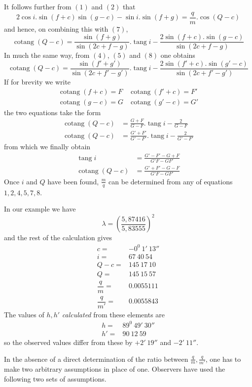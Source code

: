 It follows further from $(1)$ and $(2)$ that
\[
2\cos i.\sin(f+c)\sin(g-c)-\sin i.\sin(f+g)=\frac{q}{m}.\cos(Q-c)
\]
and hence, on combining this with $(7)$,
\[
\operatorname{cotang}(Q-c)=\frac{\sin(f+g)}{\sin(2c+f-g)}.\operatorname{tang}i-\frac{2\sin(f+c).\sin(g-c)}{\sin(2c+f-g)}
\]
In much the same way, from $(4)$, $(5)$ and $(8)$ one obtains
\[
\operatorname{cotang}(Q-c)=\frac{\sin(f'+g')}{\sin(2c+f'-g')}.\operatorname{tang}i-\frac{2\sin(f'+c).\sin(g'-c)}{\sin(2c+f'-g')}
\]
If for brevity we write
\[
\begin{array}{ll}
\operatorname{cotang}(f+c)=F&\operatorname{cotang}(f'+c)=F'\\
\operatorname{cotang}(g-c)=G&\operatorname{cotang}(g'-c)=G'
\end{array}
\]
the two equations take the form
\[
\begin{aligned}
\operatorname{cotang}(Q-c)&=\frac{G+F}{G-F}.\operatorname{tang}i-\frac{2}{G-F}\\
\operatorname{cotang}(Q-c)&=\frac{G'+F'}{G'-F'}.\operatorname{tang}i-\frac{2}{G'-F'}
\end{aligned}
\]
from which we finally obtain
\[
\begin{aligned}
\operatorname{tang}i&=\frac{G'-F'-G+F}{G'F-GF'}\\
\operatorname{cotang}(Q-c)&=\frac{G'+F'-G-F}{G'F-GF'}
\end{aligned}
\]
Once $i$ and $Q$ have been found, $\frac{m}{q}$ can be determined from any of equations $1,2,4,5,7,8$.

In our example we have
\[
\lambda=\left(\frac{5{,}87416}{5{,}83555}\right)^2
\]
and the rest of the calculation gives
\[
\begin{array}{rl}
c=&-0^0\ 1'\ 13''\\
i=&67\ 40\ 54\\
Q-c=&145\ 17\ 10\\
Q=&145\ 15\ 57\\
\dfrac{q}{m}=&0.0055111\\[4pt]
\dfrac{q}{m'}=&0.0055843
\end{array}
\]
The values of $h,h'$ \textit{calculated} from these elements are
\[
\begin{array}{rl}
h=&89^0\ 49'\ 30''\\
h'=&90\ 12\ 59
\end{array}
\]
so the observed values differ from these by $+2'\ 19''$ and $-2'\ 11''$.

In the absence of a direct determination of the ratio between $\frac{q}{m},\frac{q}{m'}$, one has to make two arbitrary assumptions in place of one. Observers have used the following two sets of assumptions.

